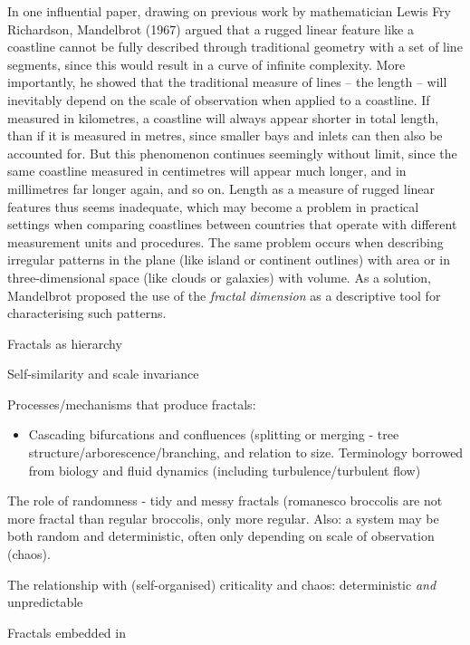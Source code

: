 \documentclass[
  12pt,
]{book}
\providecommand{\tightlist}{%
  \setlength{\itemsep}{0pt}\setlength{\parskip}{0pt}}
\begin{document}
In one influential paper, drawing on previous work by mathematician Lewis Fry Richardson, Mandelbrot (1967) argued that a rugged linear feature like a coastline cannot be fully described through traditional geometry with a set of line segments, since this would result in a curve of infinite complexity. More importantly, he showed that the traditional measure of lines -- the length -- will inevitably depend on the scale of observation when applied to a coastline. If measured in kilometres, a coastline will always appear shorter in total length, than if it is measured in metres, since smaller bays and inlets can then also be accounted for. But this phenomenon continues seemingly without limit, since the same coastline measured in centimetres will appear much longer, and in millimetres far longer again, and so on. Length as a measure of rugged linear features thus seems inadequate, which may become a problem in practical settings when comparing coastlines between countries that operate with different measurement units and procedures. The same problem occurs when describing irregular patterns in the plane (like island or continent outlines) with area or in three-dimensional space (like clouds or galaxies) with volume. As a solution, Mandelbrot proposed the use of the \emph{fractal dimension} as a descriptive tool for characterising such patterns.

Fractals as hierarchy

Self-similarity and scale invariance

Processes/mechanisms that produce fractals:

\begin{itemize}
\tightlist
\item
  Cascading bifurcations and confluences (splitting or merging - tree structure/arborescence/branching, and relation to size. Terminology borrowed from biology and fluid dynamics (including turbulence/turbulent flow)
\end{itemize}

The role of randomness - tidy and messy fractals (romanesco broccolis are not more fractal than regular broccolis, only more regular. Also: a system may be both random and deterministic, often only depending on scale of observation (chaos).

The relationship with (self-organised) criticality and chaos: deterministic \emph{and} unpredictable

Fractals embedded in
\end{document}
